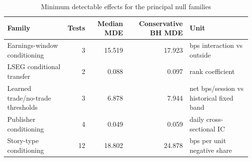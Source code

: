 \begin{table}[htbp]
\centering
\small
\caption{Minimum detectable effects for the principal null families}
\label{tab:null-mde}
\begin{tabular}{p{4.2cm}rrrp{4.2cm}}
\toprule
Family & Tests & Median MDE & Conservative BH MDE & Unit \\
\midrule
Earnings-window conditioning & 3 & 15.519 & 17.923 & bps interaction vs outside \\
LSEG conditional transfer & 2 & 0.088 & 0.097 & rank coefficient \\
Learned trade/no-trade thresholds & 3 & 6.878 & 7.944 & net bps/session vs historical fixed band \\
Publisher conditioning & 4 & 0.049 & 0.059 & daily cross-sectional IC \\
Story-type conditioning & 12 & 18.802 & 24.878 & bps per unit negative share \\
\bottomrule
\end{tabular}
\end{table}
